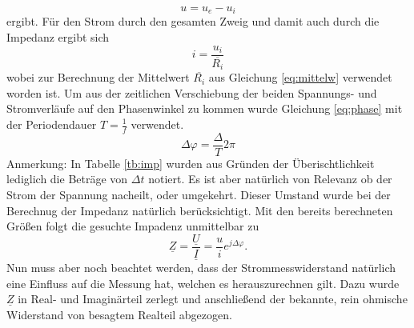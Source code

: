 \begin{equation}
	u = u_e - u_i
\end{equation}
ergibt. Für den Strom durch den gesamten Zweig und damit auch durch die Impedanz ergibt sich
\begin{equation}
	i = \frac{u_i}{\overline{R_i}}
\end{equation}
wobei zur Berechnung der Mittelwert $\overline{R_i}$ aus Gleichung \ref{eq:mittelw} verwendet worden ist. Um aus der zeitlichen Verschiebung der beiden Spannungs- und Stromverläufe auf den Phasenwinkel zu kommen wurde Gleichung \ref{eq:phase} mit der Periodendauer $T = \frac{1}{f}$ verwendet.
\begin{equation}
	\Delta \varphi = \frac{\Delta}{T}2 \pi
	\label{eq:phase}
\end{equation}
Anmerkung: In Tabelle \ref{tb:imp} wurden aus Gründen der Überischtlichkeit lediglich die Beträge von $\Delta t$ notiert. Es ist aber natürlich von Relevanz ob der Strom der Spannung nacheilt, oder umgekehrt. Dieser Umstand wurde bei der Berechnug der Impedanz natürlich berücksichtigt.
Mit den bereits berechneten Größen folgt die gesuchte Impadenz unmittelbar zu 
\begin{equation}
	\underline{Z} = \frac{\underline{U}}{\underline{I}} = \frac{u}{i} e^{j\Delta \varphi} .
\end{equation}
Nun muss aber noch beachtet werden, dass der Strommesswiderstand natürlich eine Einfluss auf die Messung hat, welchen es herauszurechnen gilt. Dazu wurde $\underline{Z}$ in Real- und Imaginärteil zerlegt und anschließend der bekannte, rein ohmische Widerstand von besagtem Realteil abgezogen. 
